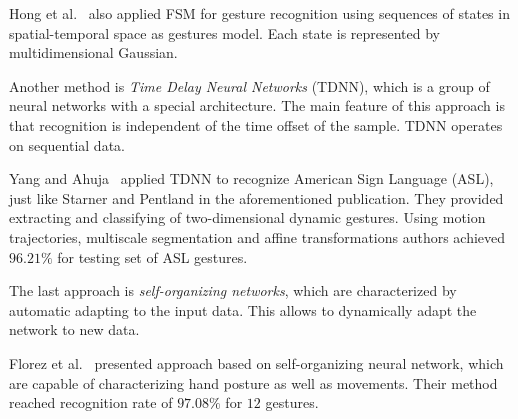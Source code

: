 Hong et al.~\cite{Hong00constructingfinite} also applied FSM for gesture recognition using sequences of states in spatial-temporal space as gestures model. Each state is represented by multidimensional Gaussian.

Another method is \emph{Time Delay Neural Networks} (TDNN), which is a group of neural networks with a special architecture. The main feature of this approach is that recognition is independent of the time offset of the sample. TDNN operates on sequential data.

Yang and Ahuja~\cite{YangAhujaComputerVision} applied TDNN to recognize American Sign Language (ASL), just like Starner and Pentland in the aforementioned publication. They provided extracting and classifying of two-dimensional dynamic gestures. Using motion trajectories, multiscale segmentation and affine transformations authors achieved $96.21\%$ for testing set of ASL gestures.

The last approach is \emph{self-organizing networks}, which are characterized by automatic adapting to the input data. This allows to dynamically adapt the network to new data.

Florez et al.~\cite{Florez:2002:HGR:874061.875461} presented approach based on self-organizing neural network, which are capable of characterizing hand posture as well as movements. Their method reached recognition rate of $97.08\%$ for $12$ gestures.
